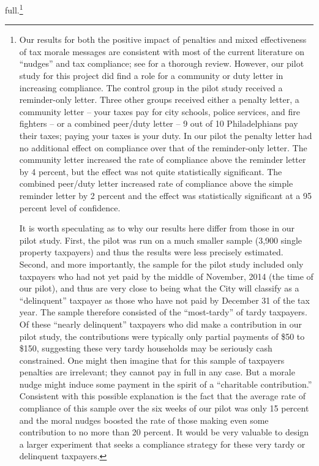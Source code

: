 \documentclass[12pt]{article}
\begin{document}
full.\footnote{\label{fn:nudges}Our results for both the positive
  impact of penalties and mixed effectiveness of tax morale messages
  are consistent with most of the current literature on ``nudges'' and
  tax compliance; see \cite{Hallsworth-14} for a thorough review. However, our pilot study
  \cite{CILMS-16} for this project did find a role for a community or
  duty letter in increasing compliance.  The control group in the
  pilot study received a reminder-only letter.  Three other groups
  received either a penalty letter, a community letter -- your taxes
  pay for city schools, police services, and fire fighters -- or a
  combined peer/duty letter -- 9 out of 10 Philadelphians pay their
  taxes; paying your taxes is your duty. In our pilot the penalty
  letter had no additional effect on compliance over that of the
  reminder-only letter.  The community letter increased the rate of
  compliance above the reminder letter by 4 percent, but the effect
  was not quite statistically significant.  The combined peer/duty
  letter increased rate of compliance above the simple reminder letter
  by 2 percent and the effect was statistically significant at a 95
  percent level of confidence.

It is worth speculating as to why our results here differ from those
in our pilot study.  First, the pilot was run on a much smaller sample
(3,900 single property taxpayers) and thus the results were less
precisely estimated.  Second, and more importantly, the sample for the
pilot study included only taxpayers who had not yet paid by the middle of
November, 2014 (the time of our pilot), and thus are very close to
being what the City will classify as a ``delinquent'' taxpayer as
those who have not paid by December 31 of the tax year.  The sample
therefore consisted of the ``most-tardy'' of tardy taxpayers.  Of
these ``nearly delinquent'' taxpayers who did make a contribution in our
pilot study, the contributions were typically only partial payments of
\$50 to \$150, suggesting these very tardy households may be seriously cash
constrained.  One might then imagine that for this sample of taxpayers
penalties are irrelevant; they cannot pay in full in any case.
But a morale nudge might induce some payment in the spirit of a
``charitable contribution.''  Consistent with this possible
explanation is the fact that the average rate of compliance of this
sample over the six weeks of our pilot was only 15 percent and the
moral nudges boosted the rate of those making even some contribution
to no more than 20 percent.  It would be very valuable to design a
larger experiment that seeks a compliance strategy for these very
tardy or delinquent taxpayers.}
\end{document}
